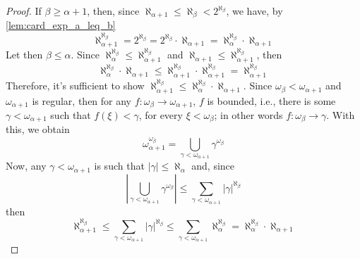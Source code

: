 \begin{proof}
    If $\beta\geq\alpha+1$, then, since $\aleph_{\alpha+1}\leq\aleph_\beta<2^{\aleph_\beta}$, we have, by \cref{lem:card_exp_a_leq_b}
    $$\aleph_{\alpha+1}^{\aleph_\beta}=2^{\aleph_\beta}=2^{\aleph_\beta}\cdot\aleph_{\alpha+1}=\aleph_\alpha^{\aleph_\beta}\cdot\aleph_{\alpha+1}$$
    Let then $\beta\leq\alpha$. Since $\aleph_\alpha^{\aleph_\beta}\leq\aleph_{\alpha+1}^{\aleph_\beta}$ and $\aleph_{\alpha+1}\leq\aleph_{\alpha+1}^{\aleph_\beta}$, then
    $$\aleph_\alpha^{\aleph_\beta}\cdot\aleph_{\alpha+1}\leq\aleph_{\alpha+1}^{\aleph_\beta}\cdot\aleph_{\alpha+1}^{\aleph_\beta}=\aleph_{\alpha+1}^{\aleph_\beta}$$
    Therefore, it's sufficient to show $\aleph_{\alpha+1}^{\aleph_\beta}\leq\aleph_\alpha^{\aleph_\beta}\cdot\aleph_{\alpha+1}$. Since $\omega_\beta<\omega_{\alpha+1}$ and $\omega_{\alpha+1}$ is regular, then for any $f:\omega_\beta\to\omega_{\alpha+1}$, $f$ is bounded, i.e., there is some $\gamma<\omega_{\alpha+1}$ such that $f(\xi)<\gamma$, for every $\xi<\omega_\beta$; in other words $f:\omega_\beta\to\gamma$. With this, we obtain
    $$\omega_{\alpha+1}^{\omega_\beta}=\bigcup_{\gamma<\omega_{\alpha+1}}\gamma^{\omega_\beta}$$
    Now, any $\gamma<\omega_{\alpha+1}$ is such that $|\gamma|\leq\aleph_\alpha$ and, since
    $$\left|\bigcup_{\gamma<\omega_{\alpha+1}}\gamma^{\omega_\beta}\right|\leq\sum_{\gamma<\omega_{\alpha+1}}|\gamma|^{\aleph_\beta}$$
    then
    $$\aleph_{\alpha+1}^{\aleph_\beta}\leq\sum_{\gamma<\omega_{\alpha+1}}|\gamma|^{\aleph_\beta}\leq\sum_{\gamma<\omega_{\alpha+1}}\aleph_\alpha^{\aleph_\beta}=\aleph_{\alpha}^{\aleph_\beta}\cdot\aleph_{\alpha+1}$$
\end{proof}
